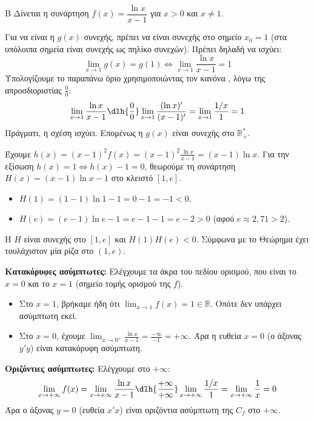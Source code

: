\begin{thema}{Β}
Δίνεται η συνάρτηση $f(x) = \dfrac{\ln x}{x-1}$ για $x > 0$ και $x \ne 1$.
\begin{erwthma}
\item Για να είναι η $g(x)$ συνεχής, πρέπει να είναι συνεχής στο σημείο $x_0 = 1$ (στα υπόλοιπα σημεία είναι συνεχής ως πηλίκο συνεχών). Πρέπει δηλαδή να ισχύει:
\[ \lim_{x\to1} g(x) = g(1) \Leftrightarrow \lim_{x\to1} \frac{\ln x}{x-1} = 1 \]
Υπολογίζουμε το παραπάνω όριο χρησιμοποιώντας τον κανόνα , λόγω της απροσδιοριστίας $\frac{0}{0}$:
\[ \lim_{x\to1} \frac{\ln x}{x-1} \dlh{\frac{0}{0}} \lim_{x\to1} \frac{(\ln x)'}{(x-1)'} = \lim_{x\to1} \frac{1/x}{1} = 1 \]
Πράγματι, η σχέση ισχύει. Επομένως η $g(x)$ είναι συνεχής στο $\mathbb{R}_+^*$.

\item Έχουμε $h(x) = (x-1)^2 f(x) = (x-1)^2 \frac{\ln x}{x-1} = (x-1)\ln x$.
Για την εξίσωση $h(x) = 1 \Leftrightarrow h(x) - 1 = 0$, θεωρούμε τη συνάρτηση $H(x) = (x-1)\ln x - 1$ στο κλειστό $[1, e]$.
\begin{itemize}
\item $H(1) = (1-1)\ln 1 - 1 = 0 - 1 = -1 < 0$.
\item $H(e) = (e-1)\ln e - 1 = e - 1 - 1 = e - 2 > 0$ (αφού $e \approx 2{,}71 > 2$).
\end{itemize}
Η $H$ είναι συνεχής στο $[1, e]$ και $H(1)H(e) < 0$. Σύμφωνα με το Θεώρημα  έχει τουλάχιστον μία ρίζα στο $(1, e)$.

\item \textbf{Κατακόρυφες ασύμπτωτες:} Ελέγχουμε τα άκρα του πεδίου ορισμού, που είναι το $x=0$ και το $x=1$ (σημείο τομής ορισμού της $f$).
\begin{itemize}
\item Στο $x=1$, βρήκαμε ήδη ότι $\lim_{x\to1} f(x) = 1 \in \mathbb{R}$. Οπότε δεν υπάρχει ασύμπτωτη εκεί.
\item Στο $x=0$, έχουμε $\lim_{x\to0^+} \frac{\ln x}{x-1} = \frac{-\infty}{-1} = +\infty$. Άρα η ευθεία $x=0$ (ο άξονας $y'y$) είναι κατακόρυφη ασύμπτωτη.
\end{itemize}
\textbf{Οριζόντιες ασύμπτωτες:} Ελέγχουμε στο $+\infty$:
\[ \lim_{x\to+\infty} f(x) = \lim_{x\to+\infty} \frac{\ln x}{x-1} \dlh{\frac{+\infty}{+\infty}} \lim_{x\to+\infty} \frac{1/x}{1} = \lim_{x\to+\infty} \frac{1}{x} = 0 \]
Άρα ο άξονας $y=0$ (ευθεία $x'x$) είναι οριζόντια ασύμπτωτη της $C_f$ στο $+\infty$.
\end{erwthma}
\end{thema}
